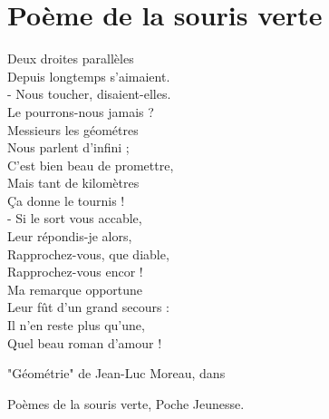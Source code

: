 \section{Poème de la souris verte}
\begin{center}
   {\cursive
   Deux droites parallèles\\
   Depuis longtemps s'aimaient.\\
   - Nous toucher, disaient-elles.\\
   Le pourrons-nous jamais ?\\
   Messieurs les géométres\\
   Nous parlent d'infini ;\\
   C'est bien beau de promettre,\\
   Mais tant de kilomètres\\
   \c Ca donne le tournis !\\

   - Si le sort vous accable,\\
   Leur répondis-je alors,\\
   Rapprochez-vous, que diable,\\
   Rapprochez-vous encor !\\
   Ma remarque opportune\\
   Leur fût d'un grand secours :\\
   Il n'en reste plus qu'une,\\
   Quel beau roman d'amour !\\
   }
   \begin{flushright}
    {\cursive "Géométrie" de Jean-Luc Moreau, dans
    
    Poèmes de la souris verte, Poche Jeunesse.}
   \end{flushright}
\end{center}
